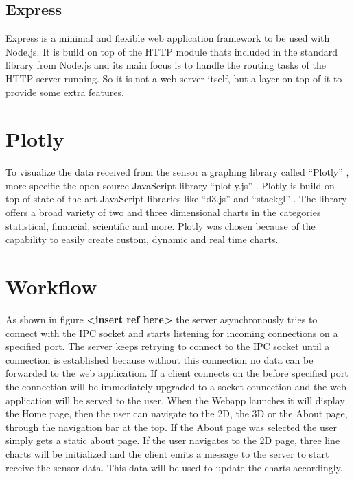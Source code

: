 \subsection{Express}
Express is a minimal and flexible web application framework to be used with Node.js. It is build on top of the HTTP module thats included in the standard library from Node.js and its main focus is to handle the routing tasks of the HTTP server running. So it is not a web server itself, but a layer on top of it to provide some extra features.

\section{Plotly}
To visualize the data received from the sensor a graphing library called ``Plotly'' \cite{Plotly}, more specific the open source JavaScript library ``plotly.js'' \cite{PlotlyJS}. Plotly is build on top of state of the art JavaScript libraries like ``d3.js'' \cite{d3} and ``stackgl'' \cite{stackgl}. The library offers a broad variety of two and three dimensional charts in the categories statistical, financial, scientific and more. Plotly was chosen because of the capability to easily create custom, dynamic and real time charts.

\section{Workflow}

As shown in figure \textbf{<insert ref here>} the server asynchronously tries to connect with the IPC socket and starts listening for incoming connections on a specified port. The server keeps retrying to connect to the IPC socket until a connection is established because without this connection no data can be forwarded to the web application. If a client connects on the before specified port the connection will be immediately upgraded to a socket connection and the web application will be served to the user. When the Webapp launches it will display the Home page, then the user can navigate to the 2D, the 3D or the About page, through the navigation bar at the top. If the About page was selected the user simply gets a static about page. If the user navigates to the 2D page, three line charts will be initialized and the client emits a message to the server to start receive the sensor data. This data will be used to update the charts accordingly.

